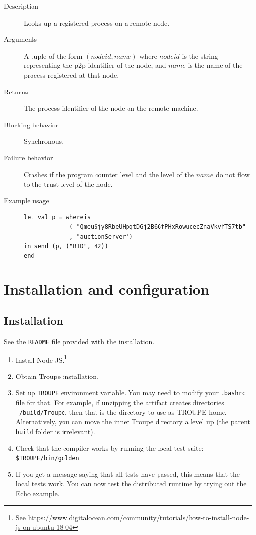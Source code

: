 \begin{description}
    \item [Description] Looks up a registered process on a remote node.
    \item [Arguments] A tuple of the form $(\mathit{nodeid}, \mathit{name})$ where $\mathit{nodeid}$ is the string representing the p2p-identifier of the node, and $\mathit{name}$ is the name of the process registered at that node.
    \item [Returns] The process identifier of the node on the remote machine. 
    \item [Blocking behavior] Synchronous. 
    \item [Failure behavior] Crashes if the program counter level and the level of the $\mathit{name}$ do not flow to the trust level of the node.
    \item [Example usage]
\begin{minipage}[t]{30em}
\begin{verbatim}
let val p = whereis 
             ( "QmeuSjy8RbeUHpqtDGj2B66fPHxRowuoecZnaVkvhTS7tb"
             , "auctionServer")
in send (p, ("BID", 42))
end
\end{verbatim}    
\end{minipage}
\end{description}

\clearpage
\section{Installation and configuration}
\label{appendix:installationandconfig}
\subsection{Installation}
See the {\tt README} file provided with the installation.
\begin{enumerate}
    \item Install Node JS.\footnote{
    See \url{https://www.digitalocean.com/community/tutorials/how-to-install-node-js-on-ubuntu-18-04}}
    \item Obtain Troupe installation.
    \item Set up {\tt TROUPE} environment variable. You may need to modify your {\tt .bashrc} file for that. For example, if unzipping the artifact creates directories {\tt ~/build/Troupe}, then that is the directory to use as TROUPE home. Alternatively, you can move the inner Troupe directory a level up (the parent {\tt build} folder is irrelevant).
    \item Check that the compiler works by running the local test suite: {\tt \$TROUPE/bin/golden}
    \item If you get a message saying that all tests have passed, this means that the local tests work. You can now test the distributed runtime by trying out the Echo example.
\end{enumerate}
\fi


